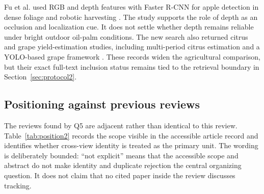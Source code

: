 Fu et al. used RGB and depth features with Faster R-CNN for apple detection in dense foliage and robotic harvesting \cite{fu2020apple}. The study supports the role of depth as an occlusion and localization cue. It does not settle whether depth remains reliable under bright outdoor oil-palm conditions. The new search also returned citrus and grape yield-estimation studies, including multi-period citrus estimation and a YOLO-based grape framework \cite{zhai2025citrusyields,ma2026grapeyield}. These records widen the agricultural comparison, but their exact full-text inclusion status remains tied to the retrieval boundary in Section~\ref{sec:protocol2}.

\subsection{Positioning against previous reviews}

The reviews found by Q5 are adjacent rather than identical to this review. Table~\ref{tab:position2} records the scope visible in the accessible article record and identifies whether cross-view identity is treated as the primary unit. The wording is deliberately bounded: ``not explicit'' means that the accessible scope and abstract do not make identity and duplicate rejection the central organizing question. It does not claim that no cited paper inside the review discusses tracking.

